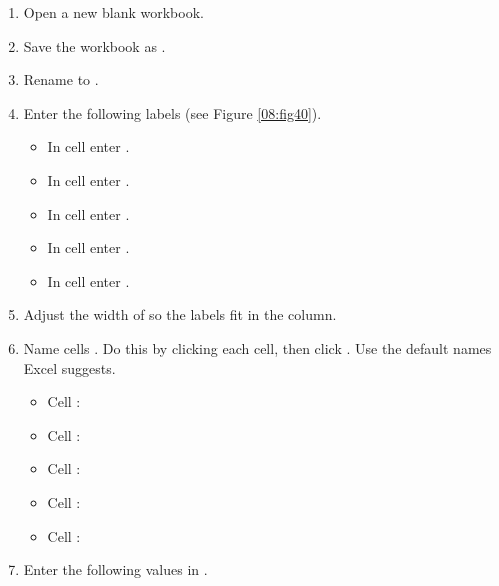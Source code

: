 \begin{enumbox}
	\begin{enumerate}
		\item Open a new blank workbook.
		\item Save the workbook as .
		\item Rename  to .
		\item Enter the following labels (see Figure \ref{08:fig40}).
		
		\begin{itemize}
			\item In cell  enter .
			\item In cell  enter .
			\item In cell  enter .
			\item In cell  enter .
			\item In cell  enter .
		\end{itemize}
		
		\item Adjust the width of  so the labels fit in the column.
		\item Name cells . Do this by clicking each cell, then click . Use the default names Excel suggests.
	
		\begin{itemize}
			\item Cell : 
			\item Cell : 
			\item Cell : 
			\item Cell : 
			\item Cell : 
		\end{itemize}
	
		\item Enter the following values in .
	

\end{enumerate}
\end{enumbox}
